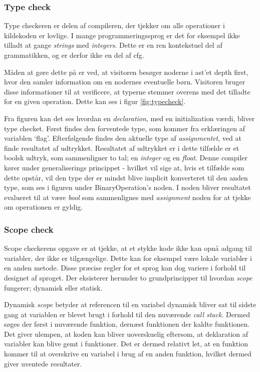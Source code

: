 \subsubsection{Type check}
    
Type checkeren er delen af compileren, der tjekker om alle operationer i kildekoden er lovlige. I mange programmeringssprog er det for eksempel ikke tilladt at gange \textit{strings} med \textit{integers}. Dette er en ren kontekstuel del af grammatikken, og er derfor ikke en del af \gls{cfg}.
    
Måden at gøre dette på er ved, at visitoren besøger noderne i \gls{ast}'et depth first, hvor den samler information om en nodernes eventuelle børn. Visitoren bruger disse informationer til at verificere, at typerne stemmer overens med det tilladte for en given operation. Dette kan ses i figur \ref{fig:typecheck}.
    
    
\noindent Fra figuren kan det ses hvordan en \textit{declaration}, med en initialization værdi, bliver type checket. Først findes den forventede type, som kommer fra erklæringen af variablen \enquote*{flag}. Efterfølgende findes den aktuelle type af \textit{assignmentet}, ved at finde resultatet af udtrykket. Resultatet af udtrykket er i dette tilfælde er et boolsk udtryk, som sammenligner to tal; en \textit{integer} og en \textit{float}. Denne compiler kører under generaliserings princippet - hvilket vil sige at, hvis et tilfælde som dette opstår, vil den type der er mindst blive implicit konverteret til den anden type, som ses i figuren under BinaryOperation's noden. I noden bliver resultatet evalueret til at være \textit{bool} som sammenlignes med \textit{assignment} noden for at tjekke om operationen er gyldig.
    
\subsubsection{Scope check}
Scope checkerens opgave er at tjekke, at et stykke kode ikke kan opnå adgang til variabler, der ikke er tilgængelige. Dette kan for eksempel være lokale variabler i en anden metode. Disse præcise regler for et sprog kan dog variere i forhold til designet af sproget. Der eksisterer herunder to grundprincipper til hvordan \textit{scope} fungerer; dynamisk eller statisk.
    
Dynamisk \textit{scope} betyder at referencen til en variabel dynamisk bliver sat til sidste gang at variablen er blevet brugt i forhold til den nuværende \textit{call stack}. Dermed søges der først i nuværende funktion, dernæst funktionen der kaldte funktionen. Det giver ulempen, at koden kan bliver uoverskuelig eftersom, at deklaration af variabler kan blive gemt i funktioner. Det er dermed relativt let, at en funktion kommer til at overskrive en variabel i brug af en anden funktion, hvilket dermed giver uventede resultater.
    
